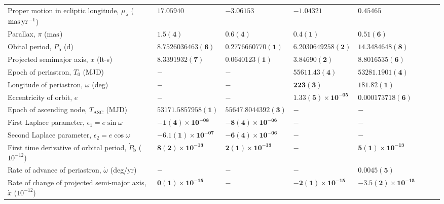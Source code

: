\begin{table}
\begin{tabular}{llllllll}
Proper motion in ecliptic longitude, $\mu_\lambda$ (${\rm mas}\,{\rm yr}^{-1}$)	 & 	 $\mathbf{ 17.05940 }$	 & 	 $\mathbf{ -3.06153 }$	 & 	 $\mathbf{ -1.04321 }$	 & 	 $\mathbf{ 0.45465 }$\\ 
Parallax, $\pi$ (${\rm mas}$)	 & 	 $\mathbf{ 1.5(4) }$	 & 	 $\mathbf{ 0.6(4) }$	 & 	 $\mathbf{ 0.4(1) }$	 & 	 $\mathbf{ 0.51(6) }$\\ 
Obital period, $P_{\mathrm{b}}$ ($\mathrm{d}$)	 & 	 $\mathbf{ 8.7526036463(6) }$	 & 	 $\mathbf{ 0.2776660770(1) }$	 & 	 $\mathbf{ 6.2030649258(2) }$	 & 	 $\mathbf{ 14.3484648(8) }$\\ 
Projected semimajor axis, $x$ (lt-s)	 & 	 $\mathbf{ 8.3391932(7) }$	 & 	 $\mathbf{ 0.0640123(1) }$	 & 	 $\mathbf{ 3.84690(2) }$	 & 	 $\mathbf{ 8.8016535(6) }$\\ 
Epoch of periastron, $T_0$ (MJD)	 & 	 $\mathbf{ - }$	 & 	 $\mathbf{ - }$	 & 	 $\mathbf{ 55611.43(4) }$	 & 	 $\mathbf{ 53281.1901(4) }$\\ 
Longitude of periastron, $\omega$ (deg)	 & 	 $\mathbf{ - }$	 & 	 $\mathbf{ - }$	 & 	 $\mathbf{ 223(3) }$	 & 	 $\mathbf{ 181.82(1) }$\\ 
Eccentricity of orbit, $e$	 & 	 $\mathbf{ - }$	 & 	 $\mathbf{ - }$	 & 	 $\mathbf{ 1.33(5)\times 10^{-05} }$	 & 	 $\mathbf{ 0.000173718(6) }$\\ 
Epoch of ascending node, $T_{\mathrm{ASC}}$ (MJD)	 & 	 $\mathbf{ 53171.5857958(1) }$	 & 	 $\mathbf{ 55647.8044392(3) }$	 & 	 $\mathbf{ - }$	 & 	 $\mathbf{ - }$\\ 
First Laplace parameter, $\epsilon_1 = e \sin \omega$	 & 	 $\mathbf{ -1(4)\times 10^{-08} }$	 & 	 $\mathbf{ -8(4)\times 10^{-06} }$	 & 	 $\mathbf{ - }$	 & 	 $\mathbf{ - }$\\ 
Second Laplace parameter, $\epsilon_2 = e \cos \omega$	 & 	 $\mathbf{ -6.1(1)\times 10^{-07} }$	 & 	 $\mathbf{ -6(4)\times 10^{-06} }$	 & 	 $\mathbf{ - }$	 & 	 $\mathbf{ - }$\\ 
First time derivative of orbital period, ${\dot P}_{\mathrm{b}}$ ($10^{-12}$)	 & 	 $\mathbf{ 8(2)\times 10^{-13} }$	 & 	 $\mathbf{ 2(1)\times 10^{-13} }$	 & 	 $\mathbf{ - }$	 & 	 $\mathbf{ 5(1)\times 10^{-13} }$\\ 
Rate of advance of periastron, ${\dot \omega}$ (deg/yr)	 & 	 $\mathbf{ - }$	 & 	 $\mathbf{ - }$	 & 	 $\mathbf{ - }$	 & 	 $\mathbf{ 0.0045(5) }$\\ 
Rate of change of projected semi-major axis, ${\dot x}$ ($10^{-12}$)	 & 	 $\mathbf{ 0(1)\times 10^{-15} }$	 & 	 $\mathbf{ - }$	 & 	 $\mathbf{ -2(1)\times 10^{-15} }$	 & 	 $\mathbf{ -3.5(2)\times 10^{-15} }$\\ 

\end{tabular}
\end{table}
